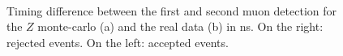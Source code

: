 \documentclass[twoside,        %
               BCOR12mm,       %
               ngerman,english, %
               fleqn,headsepline=false,footsepline=false
              ]{Vorlage/MFPREPORT}
\begin{document}
\begin{figure}
     \begin{center}
         \\ %
    \end{center}
    \caption{Timing difference between the first and second muon detection for
    the $Z$ monte-carlo (a) and the real data (b) in ns. On the right: rejected
events. On the left: accepted events.}
   \label{fig:timing}
\end{figure}
\end{document}
